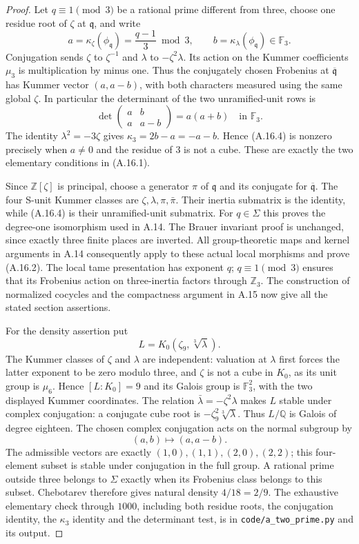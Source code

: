 \begin{proof}
Let $q\equiv1\pmod3$ be a rational prime different from three,
choose one residue root of $\zeta$ at $\mathfrak q$, and write
\[
 a=\kappa_\zeta(\phi_{\mathfrak q})
       =\frac{q-1}{3}\bmod3,
 \qquad b=\kappa_\lambda(\phi_{\mathfrak q})\in\mathbb F_3.
\]
Conjugation sends $\zeta$ to $\zeta^{-1}$ and
$\lambda$ to $-\zeta^2\lambda$. Its action on the Kummer
coefficients $\mu_3$ is multiplication by minus one. Thus the
conjugately chosen Frobenius at $\overline{\mathfrak q}$ has
Kummer vector $(a,a-b)$, with both characters measured using
the same global $\zeta$. In particular the determinant of the
two unramified-unit rows is
\[
 \det\begin{pmatrix}a&b\\a&a-b\end{pmatrix}
       =a(a+b)\quad\text{in }\mathbb F_3.
 \tag{A.16.4}
\]
The identity $\lambda^2=-3\zeta$ gives
$\kappa_3=2b-a=-a-b$. Hence (A.16.4) is nonzero precisely
when $a\ne0$ and the residue of $3$ is not a cube. These are
exactly the two elementary conditions in (A.16.1).

Since $\mathbb Z[\zeta]$ is principal, choose a generator $\pi$
of $\mathfrak q$ and its conjugate for
$\overline{\mathfrak q}$. The four S-unit Kummer classes are
$\zeta,\lambda,\pi,\bar\pi$. Their inertia submatrix is the
identity, while (A.16.4) is their unramified-unit submatrix.
For $q\in\Sigma$ this proves the degree-one isomorphism used
in A.14. The Brauer invariant proof is unchanged, since exactly
three finite places are inverted. All group-theoretic maps and
kernel arguments in A.14 consequently apply to these actual
local morphisms and prove (A.16.2). The local tame presentation
has exponent $q$; $q\equiv1\pmod3$ ensures that its Frobenius
action on three-inertia factors through $\mathbb Z_3$.
The construction of normalized cocycles and the compactness
argument in A.15 now give all the stated section assertions.

For the density assertion put
\[
 L=K_0(\zeta_9,\sqrt[3]{\lambda}).
\]
The Kummer classes of $\zeta$ and $\lambda$ are independent:
valuation at $\lambda$ first forces the latter exponent to be
zero modulo three, and $\zeta$ is not a cube in $K_0$, as its
unit group is $\mu_6$. Hence $[L:K_0]=9$ and its Galois group
is $\mathbb F_3^2$, with the two displayed Kummer coordinates.
The relation $\bar\lambda=-\zeta^2\lambda$ makes $L$ stable
under complex conjugation: a conjugate cube root is
$-\zeta_9^2\sqrt[3]{\lambda}$. Thus $L/\mathbb Q$ is
Galois of degree eighteen. The chosen complex conjugation
acts on the normal subgroup by
\[
 (a,b)\longmapsto(a,a-b).
\]
The admissible vectors are exactly
$(1,0),(1,1),(2,0),(2,2)$; this four-element subset is stable
under conjugation in the full group. A rational prime outside
three belongs to $\Sigma$ exactly when its Frobenius class
belongs to this subset. Chebotarev
\cite[V.3.23]{MilneCFT} therefore gives natural density
$4/18=2/9$. The exhaustive elementary check through $1000$,
including both residue roots, the conjugation identity, the
$\kappa_3$ identity and the determinant test, is in
\texttt{code/a\_two\_prime.py} and its output.
\end{proof}


